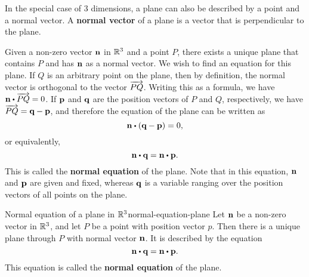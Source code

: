 In the special case of 3 dimensions, a plane can also be described by a
point and a normal vector. A \textbf{normal vector}%
%
 of a plane is a vector that is
perpendicular to the plane.
\begin{center}
\end{center}
Given a non-zero vector $\mbox{\bf n}$ in $\mathbb{R}^3$ and a point $P$, there
exists a unique plane that contains $P$ and has $\mbox{\bf n}$ as a normal
vector. We wish to find an equation for this plane. If $Q$ is an
arbitrary point on the plane, then by definition, the normal vector is
orthogonal to the vector $\overrightarrow{PQ}$. Writing this as a formula,
we have $\vect{n} \dotprod \longvect{PQ} = 0$. If $\mbox{\bf p}$ and
$\mbox{\bf q}$ are the position vectors of $P$ and $Q$, respectively, we
have $\overrightarrow{PQ} = \mbox{\bf q}-\mbox{\bf p}$, and therefore the equation
of the plane can be written as
\begin{equation*}
  \vect{n} \dotprod (\vect{q}-\vect{p}) = 0,
\end{equation*}
or equivalently,
\begin{equation*}
  \vect{n} \dotprod \vect{q} = \vect{n} \dotprod \vect{p}.
\end{equation*}
This is called the \textbf{normal equation} of the plane. Note that in
this equation, $\mbox{\bf n}$ and $\mbox{\bf p}$ are given and fixed, whereas
$\mbox{\bf q}$ is a variable ranging over the position vectors of all
points on the plane.

\begin{definition}{Normal equation of a plane in $\mathbb{R}^3$}{normal-equation-plane}
  Let $\mbox{\bf n}$ be a non-zero vector in $\mathbb{R}^3$, and let $P$ be a
  point with position vector $p$. Then there is a unique plane through
  $P$ with normal vector $\mbox{\bf n}$. It is described by the equation
  \begin{equation*}
    \vect{n} \dotprod \vect{q} = \vect{n} \dotprod \vect{p}.
  \end{equation*}
  This equation is called the \textbf{normal
    equation}%
   of
  the plane.
\end{definition}

